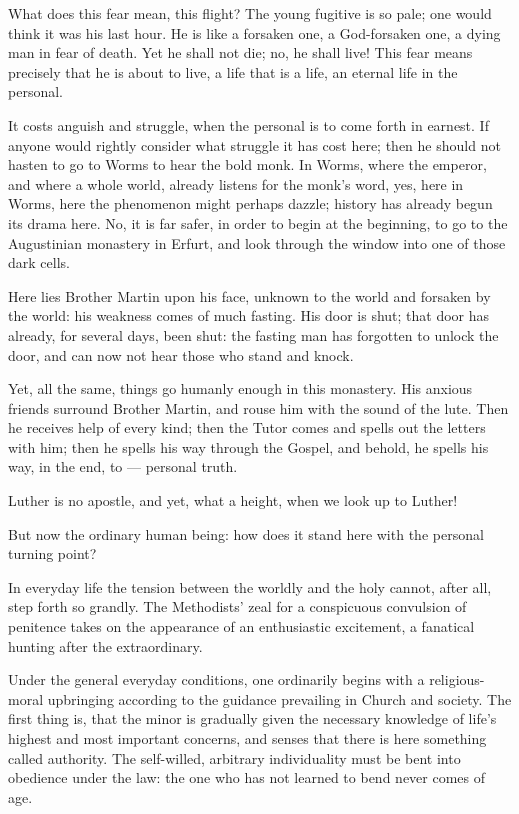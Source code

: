 \documentclass[12pt,a4paper]{book}
\begin{document}
What does this fear mean, this flight? The young fugitive is so pale; one would think it was his last hour. He is like a forsaken one, a God-forsaken one, a dying man in fear of death. Yet he shall not die; no, he shall live! This fear means precisely that he is about to live, a life that is a life, an eternal life in the personal.

It costs anguish and struggle, when the personal is to come forth in earnest. If anyone would rightly consider what struggle it has cost here; then he should not hasten to go to Worms to hear the bold monk. In Worms, where the emperor, and where a whole world, already listens for the monk's word, yes, here in Worms, here the phenomenon might perhaps dazzle; history has already begun its drama here. No, it is far safer, in order to begin at the beginning, to go to the Augustinian monastery in Erfurt, and look through the window into one of those dark cells.

Here lies Brother Martin upon his face, unknown to the world and forsaken by the world: his weakness comes of much
fasting. His door is shut; that door has already, for several days, been shut: the fasting man has forgotten to unlock the door, and can now not hear those who stand and knock.

Yet, all the same, things go humanly enough in this monastery. His anxious friends surround Brother Martin, and rouse him with the sound of the lute. Then he receives help of every kind; then the Tutor comes and spells out the letters with him; then he spells his way through the Gospel, and behold, he spells his way, in the end, to --- personal truth.

Luther is no apostle, and yet, what a height, when we look up to Luther!

But now the ordinary human being: how does it stand here with the personal turning point?

In everyday life the tension between the worldly and the holy cannot, after all, step forth so grandly. The Methodists' zeal for a conspicuous convulsion of penitence takes on the appearance of an enthusiastic excitement, a fanatical hunting after the extraordinary.

Under the general everyday conditions, one ordinarily begins with a religious-moral upbringing according to the guidance prevailing in Church and society. The first thing is, that the minor is gradually given the necessary knowledge of life's highest and most important concerns, and senses that there is here something called authority. The self-willed, arbitrary individuality must be bent into obedience under the law: the one who has not learned to bend never comes of age.
\end{document}
